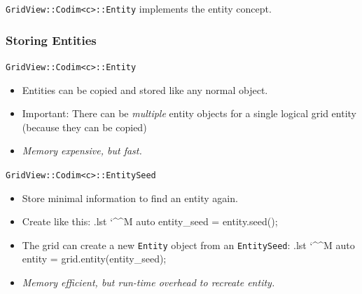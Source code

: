 \documentclass[ignorenonframetext,11pt]{beamer}
\makeatletter
\theoremstyle{definition}
\newenvironment{codeblock}{%
  \begin{tcolorbox}[size=small,oversize,boxrule=0pt,opacityframe=0,colback=blue!30!black!5!white]}{%
  \end{tcolorbox}}
\newenvironment{cppcode}{%
  \begingroup
  \@bsphack
  \immediate\openout\lstvrb@out\jobname.lst
  \let\do\@makeother\dospecials\catcode`\^^M\active
  \def\verbatim@processline{%
    \immediate\write\lstvrb@out{\the\verbatim@line}}%
  \verbatim@start}{%
  \immediate\closeout\lstvrb@out
  \@esphack
  \endgroup
  \begin{codeblock}
    \vspace*{-1ex}
    
    \vspace*{-1ex}
  \end{codeblock}}
\makeatother
\begin{document}
\begin{frame}
  \pause
  \lstinline!GridView::Codim<c>::Entity!
  implements the entity concept.

\end{frame}

\begin{frame}[fragile]
  \frametitle{Storing Entities}

  \vfill

  \pause
  \lstinline!GridView::Codim<c>::Entity!
  \begin{itemize}
  \item Entities can be copied and stored like any normal object.
  \item Important: There can be \emph{multiple} entity objects for a single logical grid entity (because they can be copied)
  \item \emph{Memory expensive, but fast.}
  \end{itemize}

  \vfill

  \pause

  \lstinline!GridView::Codim<c>::EntitySeed!


  \begin{itemize}
  \item Store minimal information to find an entity again.
  \item Create like this:
    \begin{cppcode}
auto entity_seed = entity.seed();
    \end{cppcode}
  \item The grid can create a new \lstinline!Entity! object from an \lstinline!EntitySeed!:
    \begin{cppcode}
auto entity = grid.entity(entity_seed);
    \end{cppcode}
  \item \emph{Memory efficient, but run-time overhead to recreate entity.}
  \end{itemize}

\end{frame}

\end{document}
